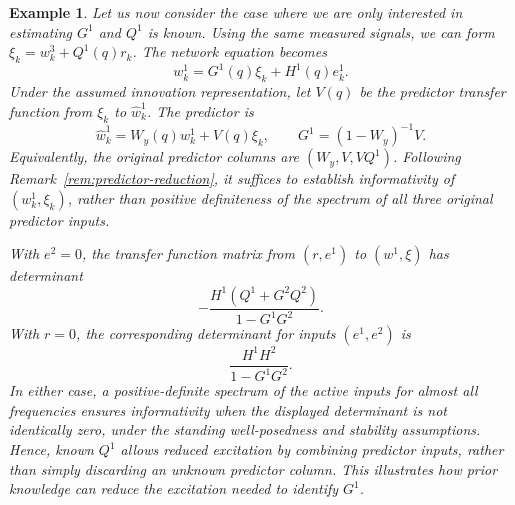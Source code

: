 \documentclass[journal,twoside,web]{ieeecolor}
\newtheorem{exmp}{Example}
\begin{document}
\begin{exmp}
%
Let us now consider the case where we are only interested in estimating
$G^1$ and $Q^1$ is known. Using the same measured signals, we can form
$\xi_k=w_k^3+Q^1(q)r_k$. The network equation becomes
%
$$w_k^1=G^1(q)\xi_k+H^1(q)e_k^1.$$
%
Under the assumed innovation representation, let $V(q)$ be the predictor
transfer function from $\xi_k$ to $\hat w_k^1$. The predictor is
%
$$\hat w_k^1=W_y(q)w_k^1+V(q)\xi_k,\qquad G^1=(1-W_y)^{-1}V.$$
%
Equivalently, the original predictor columns are $(W_y,V,VQ^1)$. Following
Remark~\ref{rem:predictor-reduction}, it suffices to establish informativity of
$(w_k^1,\xi_k)$, rather than positive definiteness of the spectrum of all three
original predictor inputs.

With $e^2=0$, the transfer function matrix from $(r,e^1)$ to $(w^1,\xi)$ has determinant
%
$$-\frac{H^1(Q^1+G^2Q^2)}{1-G^1G^2}.$$
%
With $r=0$, the corresponding determinant for inputs $(e^1,e^2)$ is
%
$$\frac{H^1H^2}{1-G^1G^2}.$$
%
In either case, a positive-definite spectrum of the active inputs for almost all
frequencies ensures informativity when the displayed determinant is not
identically zero, under the standing well-posedness and stability assumptions.
Hence, known $Q^1$ allows reduced excitation by combining predictor inputs,
rather than simply discarding an unknown predictor column. This illustrates
how prior knowledge can reduce the excitation needed to identify $G^1$.
%
\end{exmp}
\end{document}
